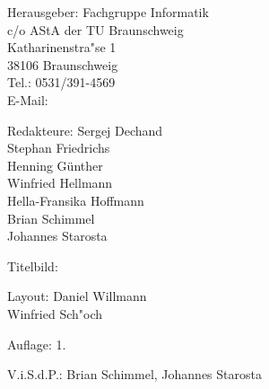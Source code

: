 \begin{nimpressum}
\item[Herausgeber:]
	Fachgruppe Informatik\\
	c/o AStA der TU Braunschweig\\
	Katharinenstra"se 1\\
	38106 Braunschweig\\
	Tel.: 0531/391-4569\\
	E-Mail: \\
      \item[Redakteure:]
        Sergej Dechand\\
	Stephan Friedrichs\\
        Henning Günther\\
        Winfried Hellmann\\
        Hella-Fransika Hoffmann\\
        Brian Schimmel\\
        Johannes Starosta
\item[Titelbild:]
\item[Layout:]
	Daniel Willmann\\
	Winfried Sch"och

%
\item[Auflage:]
  1.
\item[V.i.S.d.P.:]  %
  Brian Schimmel, Johannes Starosta
\end{nimpressum}

